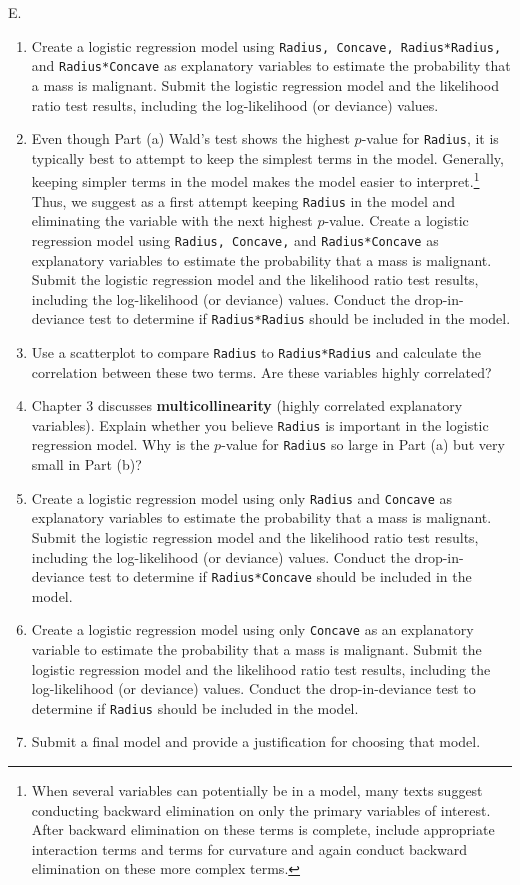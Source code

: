 \documentclass[
]{report}
\newcounter{excount}
\renewcommand{\theexcount}{E\arabic{excount}}
\begin{document}
\begin{list}{\theexcount.}{ \setlength{\itemsep}{1.2em}}
  \begin{enumerate}
    \item Create a logistic regression model using \texttt{Radius, Concave, Radius*Radius,} and \texttt{Radius*Concave} as explanatory variables to estimate the probability that a mass is malignant. Submit the logistic regression model and the likelihood ratio test results, including the log-likelihood (or deviance) values.
    \item Even though Part (a) Wald’s test shows the highest $p$-value for \texttt{Radius}, it is typically best to attempt to keep the simplest terms in the model. Generally, keeping simpler terms in the model makes the model easier to interpret.\footnote{When several variables can potentially be in a model, many texts suggest conducting backward elimination on only the primary variables of interest. After backward elimination on these terms is complete, include appropriate interaction terms and terms for curvature and again conduct backward elimination on these more complex terms.} Thus, we suggest as a first attempt keeping \texttt{Radius} in the model and eliminating the variable with the next highest $p$-value. Create a logistic regression model using \texttt{Radius, Concave,} and \texttt{Radius*Concave} as explanatory variables to estimate the probability that a mass is malignant. Submit the logistic regression model and the likelihood ratio test results, including the log-likelihood (or deviance) values. Conduct the drop-in-deviance test to determine if \texttt{Radius*Radius} should be included in the model.
    \item Use a scatterplot to compare \texttt{Radius} to \texttt{Radius*Radius} and calculate the correlation between these two terms. Are these variables highly correlated?
    \item Chapter 3 discusses \textbf{multicollinearity} (highly correlated explanatory variables). Explain whether you believe \texttt{Radius} is important in the logistic regression model. Why is the $p$-value for \texttt{Radius} so large in Part (a) but very small in Part (b)?
    \item Create a logistic regression model using only \texttt{Radius} and \texttt{Concave} as explanatory variables to estimate the probability that a mass is malignant. Submit the logistic regression model and the likelihood ratio test results, including the log-likelihood (or deviance) values. Conduct the drop-in-deviance test to determine if \texttt{Radius*Concave} should be included in the model.
    \item Create a logistic regression model using only \texttt{Concave} as an explanatory variable to estimate the probability that a mass is malignant. Submit the logistic regression model and the likelihood ratio test results, including the log-likelihood (or deviance) values. Conduct the drop-in-deviance test to determine if \texttt{Radius} should be included in the model.
    \item Submit a final model and provide a justification for choosing that model.
  \end{enumerate}


\end{list}
\end{document}

